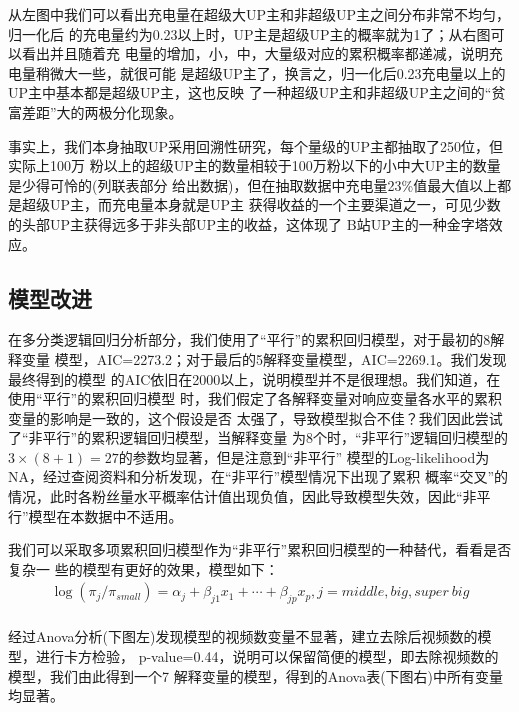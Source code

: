 \documentclass{ctexart}
\begin{document}
从左图中我们可以看出充电量在超级大UP主和非超级UP主之间分布非常不均匀，归一化后
的充电量约为0.23以上时，UP主是超级UP主的概率就为1了；从右图可以看出并且随着充
电量的增加，小，中，大量级对应的累积概率都递减，说明充电量稍微大一些，就很可能
是超级UP主了，换言之，归一化后0.23充电量以上的UP主中基本都是超级UP主，这也反映
了一种超级UP主和非超级UP主之间的“贫富差距”大的两极分化现象。

事实上，我们本身抽取UP采用回溯性研究，每个量级的UP主都抽取了250位，但实际上100万
粉以上的超级UP主的数量相较于100万粉以下的小中大UP主的数量是少得可怜的(列联表部分
给出数据)，但在抽取数据中充电量23\%值最大值以上都是超级UP主，而充电量本身就是UP主
获得收益的一个主要渠道之一，可见少数的头部UP主获得远多于非头部UP主的收益，这体现了
B站UP主的一种金字塔效应。

\subsection{模型改进}

在多分类逻辑回归分析部分，我们使用了“平行”的累积回归模型，对于最初的8解释变量
模型，AIC=2273.2；对于最后的5解释变量模型，AIC=2269.1。我们发现最终得到的模型
的AIC依旧在2000以上，说明模型并不是很理想。我们知道，在使用“平行”的累积回归模型
时，我们假定了各解释变量对响应变量各水平的累积变量的影响是一致的，这个假设是否
太强了，导致模型拟合不佳？我们因此尝试了“非平行”的累积逻辑回归模型，当解释变量
为8个时，“非平行”逻辑回归模型的$3\times(8+1)=27$的参数均显著，但是注意到“非平行”
模型的Log-likelihood为NA，经过查阅资料和分析发现，在“非平行”模型情况下出现了累积
概率“交叉”的情况，此时各粉丝量水平概率估计值出现负值，因此导致模型失效，因此“非平
行”模型在本数据中不适用。

我们可以采取多项累积回归模型作为“非平行”累积回归模型的一种替代，看看是否复杂一
些的模型有更好的效果，模型如下：
\begin{equation}
\begin{aligned}
    \log(\pi_j/\pi_{small})=\alpha_j+\beta_{j1}x_1+\cdots+\beta_{jp}x_p, j=middle,big,super\ big\\
\end{aligned}  
\end{equation}

经过Anova分析(下图左)发现模型的视频数变量不显著，建立去除后视频数的模型，进行卡方检验，
p-value=0.44，说明可以保留简便的模型，即去除视频数的模型，我们由此得到一个7
解释变量的模型，得到的Anova表(下图右)中所有变量均显著。
\end{document}
